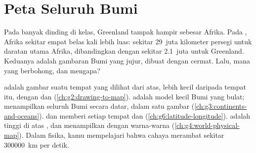 \chapter{Peta Seluruh Bumi}\label{ch:g9:maps-of-the-earth}

Pada banyak  dinding di kelas, Greenland tampak hampir sebesar Afrika.
Pada , Afrika sekitar empat belas kali lebih luas: sekitar
29~juta kilometer persegi untuk daratan utama Afrika, dibandingkan dengan
sekitar 2.1~juta untuk Greenland. Keduanya adalah gambaran Bumi yang
jujur, dibuat dengan cermat. Lalu, mana yang berbohong, dan mengapa?

\begin{recall}
 adalah gambar suatu tempat yang dilihat dari atas, lebih kecil
daripada tempat itu, dengan  dan 
(\cref{ch:g2:drawing-to-map}).  adalah model kecil Bumi yang
bulat;  menampilkan seluruh Bumi secara datar, dalam satu gambar
(\cref{ch:g3:continents-and-oceans}).  dan  memberi setiap
tempat  dan  (\cref{ch:g6:latitude-longitude}). 
adalah tinggi di atas , dan  menampilkan 
dengan warna-warna (\cref{ch:g4:world-physical-map}). Dalam fisika, kamu
mempelajari bahwa cahaya merambat sekitar \qty{300000}{km} per detik.
\end{recall}

